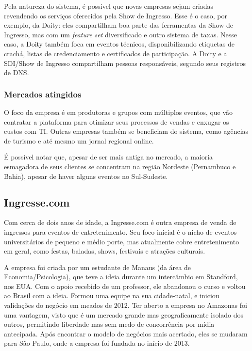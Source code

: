 \documentclass[12pt,a4paper,twoside,hyphens,english,brazil]{abntex2}
\begin{document}
Pela natureza do sistema, é possível que novas empresas sejam criadas revendendo os serviços oferecidos pela Show de Ingresso. Esse é o caso, por exemplo, da Doity: eles compartilham boa parte das ferramentas da Show de Ingresso, mas com um \emph{feature set} diversificado e outro sistema de taxas. Nesse caso, a Doity também foca em eventos técnicos, disponibilizando etiquetas de crachá, listas de credenciamento e certificados de participação. A Doity e a SDI/Show de Ingresso compartilham pessoas responsáveis, segundo seus registros de DNS.

\subsubsection*{Mercados atingidos}
O foco da empresa é em produtoras e grupos com múltiplos eventos, que vão contratar a plataforma para otimizar seus processos de vendas e enxugar os custos com TI. Outras empresas também se beneficiam do sistema, como agências de turismo e até mesmo um jornal regional online.

É possível notar que, apesar de ser mais antiga no mercado, a maioria esmagadora de seus clientes se concentram na região Nordeste (Pernambuco e Bahia), apesar de haver alguns eventos no Sul-Sudeste.

\subsection{Ingresse.com}
Com cerca de dois anos de idade, a Ingresse.com é outra empresa de venda de ingressos para eventos de entretenimento. Seu foco inicial é o nicho de eventos universitários de pequeno e médio porte, mas atualmente cobre entretenimento em geral, como festas, baladas, shows, festivais e atrações culturais.

A empresa foi criada por um estudante de Manaus (da área de Economia/Psicologia), que teve a ideia durante um intercâmbio em Standford, nos EUA. Com o apoio recebido de um professor, ele abandonou o curso e voltou ao Brasil com a ideia. Formou uma equipe na sua cidade-natal, e iniciou validações do negócio em meados de 2012. Ter aberto a empresa no Amazonas foi uma vantagem, visto que é um mercado grande mas geograficamente isolado dos outros, permitindo liberdade mas sem medo de concorrência por mídia antecipada. Após encontrar o modelo de negócios mais acertado, eles se mudaram para São Paulo, onde a empresa foi fundada no início de 2013.\cite{ingresse-hypeness}\cite{ingresse-ig}
\end{document}
